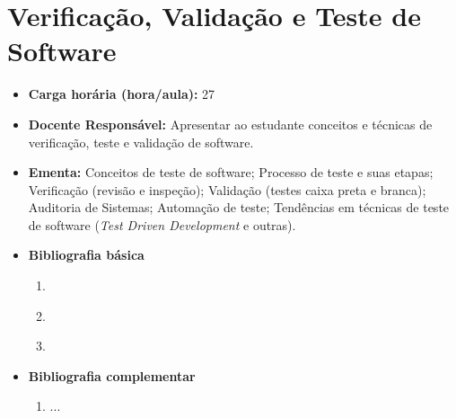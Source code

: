 \documentclass[11pt,fleqn]{book} %
\begin{document}
\section{Verificação, Validação e Teste de Software}\label{3_testsoft}
\begin{itemize}
	\item \textbf{Carga horária (hora/aula):} 27
	\item \textbf{Docente Responsável:} Apresentar ao estudante conceitos e técnicas de verificação, teste e validação de software.
	\item \textbf{Ementa:} 
	Conceitos de teste de software;
	Processo de teste e suas etapas;
	Verificação (revisão e inspeção);
	Validação (testes caixa preta e branca);
	Auditoria de Sistemas;
	Automação de teste;
	Tendências em técnicas de teste de software (\textit{Test Driven Development} e outras).
	\item \textbf{Bibliografia básica}
	\begin{enumerate}
		\item ~\cite{pressman2016engenharia}
		\item ~\cite{sommerville2011engenharia}
		\item ~\cite{rios2006teste} 
	\end{enumerate}
	\item \textbf{Bibliografia complementar}
	\begin{enumerate}
		\item ...
	\end{enumerate} 	
\end{itemize}


\newpage
\end{document}
